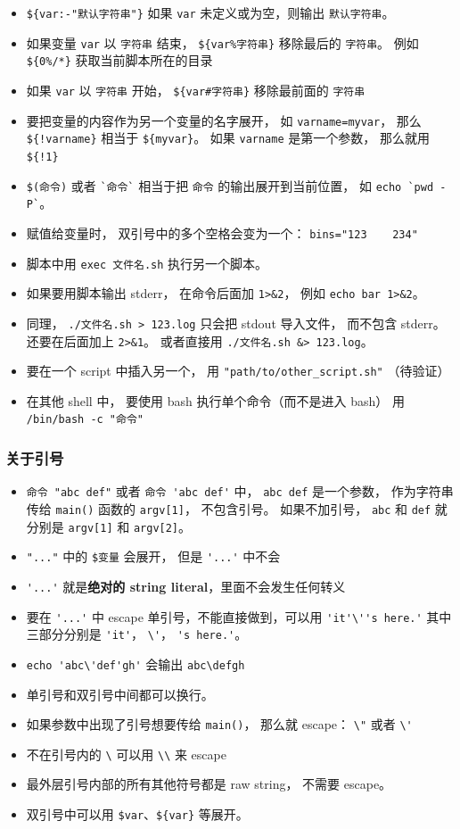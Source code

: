 \begin{itemize}
\item \verb`${var:-"默认字符串"}` 如果 \verb`var` 未定义或为空，则输出 \verb`默认字符串`。
\item 如果变量 \verb`var` 以 \verb`字符串` 结束， \verb`${var%字符串}` 移除最后的 \verb`字符串`。 例如 \verb`${0%/*}` 获取当前脚本所在的目录
\item 如果 \verb`var` 以 \verb`字符串` 开始， \verb`${var#字符串}` 移除最前面的 \verb`字符串`
\item 要把变量的内容作为另一个变量的名字展开， 如 \verb`varname=myvar`， 那么 \verb`${!varname}` 相当于 \verb`${myvar}`。 如果 \verb`varname` 是第一个参数， 那么就用 \verb`${!1}`
\item \verb`$(命令)` 或者 \verb|`命令`| 相当于把 \verb`命令` 的输出展开到当前位置， 如 \verb|echo `pwd -P`|。
\item 赋值给变量时， 双引号中的多个空格会变为一个： \verb`bins="123    234"`
\item 脚本中用 \verb`exec 文件名.sh` 执行另一个脚本。
\item 如果要用脚本输出 stderr， 在命令后面加 \verb`1>&2`， 例如 \verb`echo bar 1>&2`。
\item 同理， \verb`./文件名.sh > 123.log` 只会把 stdout 导入文件， 而不包含 stderr。 还要在后面加上 \verb`2>&1`。 或者直接用 \verb`./文件名.sh &> 123.log`。
\item 要在一个 script 中插入另一个， 用 \verb`"path/to/other_script.sh"` （待验证）
\item 在其他 shell 中， 要使用 bash 执行单个命令（而不是进入 bash） 用 \verb`/bin/bash -c "命令"`
\end{itemize}

\subsubsection{关于引号}
\begin{itemize}
\item \verb`命令 "abc def"` 或者 \verb`命令 'abc def'` 中， \verb`abc def` 是一个参数， 作为字符串传给 \verb`main()` 函数的 \verb`argv[1]`， 不包含引号。 如果不加引号， \verb`abc` 和 \verb`def` 就分别是 \verb`argv[1]` 和 \verb`argv[2]`。
\item \verb`"..."` 中的 \verb`$变量` 会展开， 但是 \verb`'...'` 中不会
\item \verb`'...'` 就是\textbf{绝对的 string literal}，里面不会发生任何转义
\item 要在 \verb`'...'` 中 escape 单引号，不能直接做到，可以用 \verb`'it'\''s here.'` 其中三部分分别是 \verb`'it'`， \verb`\'`， \verb`'s here.'`。
\item \verb`echo 'abc\'def'gh'` 会输出 \verb`abc\defgh`
\item 单引号和双引号中间都可以换行。
\item 如果参数中出现了引号想要传给 \verb`main()`， 那么就 escape： \verb`\"` 或者 \verb`\'`
\item 不在引号内的 \verb`\` 可以用 \verb`\\` 来 escape
\item 最外层引号内部的所有其他符号都是 raw string， 不需要 escape。
\item 双引号中可以用 \verb`$var`、\verb`${var}` 等展开。
\end{itemize}

